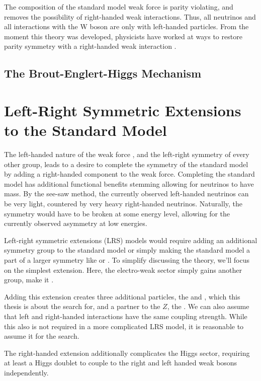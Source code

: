The \vminusa composition of the standard model weak force is parity violating, and removes the possibility of right-handed weak interactions.  Thus, all neutrinos and all interactions with the W boson are only with left-handed particles. From the moment this theory was developed, physicists have worked at ways to restore parity symmetry with a right-handed weak interaction \cite{lr}\cite{lr1}.

\subsection{The Brout-Englert-Higgs Mechanism}
 
\section{Left-Right Symmetric Extensions to the Standard Model}
\label{sec:LRStheory}
The left-handed nature of the weak force \SUtwoL, and the left-right symmetry of every other group, leads to a desire to complete the symmetry of the standard model by adding a right-handed component to the weak force.  Completing the standard model has additional functional benefits stemming allowing for neutrinos to have mass.  By the see-saw method, the currently observed left-handed neutrinos can be very light, countered by very heavy right-handed neutrinos.  Naturally, the symmetry would have to be broken at some energy level, allowing for the currently observed asymmetry at low energies.

Left-right symmetric extensions (LRS) models would require adding an additional symmetry group to the standard model or simply making the standard model a part of a larger symmetry like \SUfive or \Oten.  To simplify discussing the theory, we'll focus on the simplest extension.  Here, the electro-weak sector simply gains another \SUtwo group, make it \SUlrs.

Adding this extension creates three additional particles, the \WR and \NR, which this thesis is about the search for, and a partner to the \ensuremath{Z}, the \Zprime.  We can also assume that left and right-handed interactions have the same coupling strength.  While this also is not required in a more complicated LRS model, it is reasonable to assume it for the search.

The right-handed extension additionally complicates the Higgs sector, requiring at least a Higgs doublet to couple to the right and left handed weak bosons independently.



